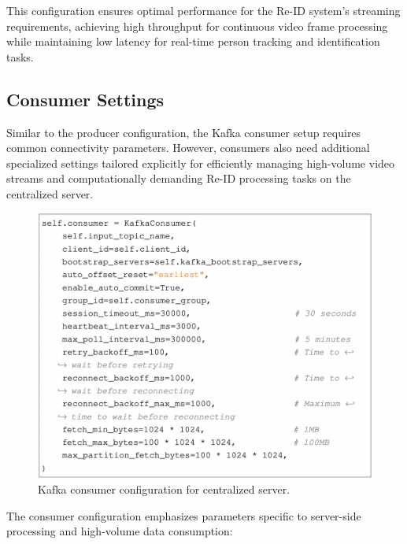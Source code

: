 This configuration ensures optimal performance for the Re-ID system's streaming requirements, achieving high throughput for continuous video frame processing while maintaining low latency for real-time person tracking and identification tasks.

\subsection{Consumer Settings}

Similar to the producer configuration, the Kafka consumer setup requires common connectivity parameters. However, consumers also need additional specialized settings tailored explicitly for efficiently managing high-volume video streams and computationally demanding Re-ID processing tasks on the centralized server.

\begin{figure}[htbp]
    \centering
    \includegraphics[width=1\textwidth]{Figure/consumer_conf.png}
    \caption{Kafka consumer configuration for centralized server.}
    \label{fig:consumer_config}
\end{figure}

The consumer configuration emphasizes parameters specific to server-side processing and high-volume data consumption:

